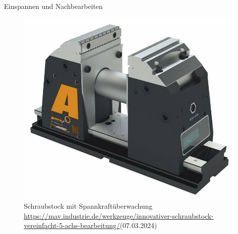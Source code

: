 \documentclass[../slides.tex]{subfiles}
\begin{document}
\begin{frame}{Einspannen und Nachbearbeiten}
  \begin{figure}[]
      \centering
      \includegraphics[height=\textheight-80pt]{img_niklas/TeleSense_mit_Backen_final_93BB1CAF-5AC9-467B-ABD7-22EEFC24189A.jpg}
      \caption{Schraubstock mit Spannkraftüberwachung \\{\url{https://mav.industrie.de/werkzeuge/innovativer-schraubstock-vereinfacht-5-achs-bearbeitung/}}(07.03.2024)}
      \label{fig:schraubstock}
    \end{figure}
    
\end{frame}
\end{document}
